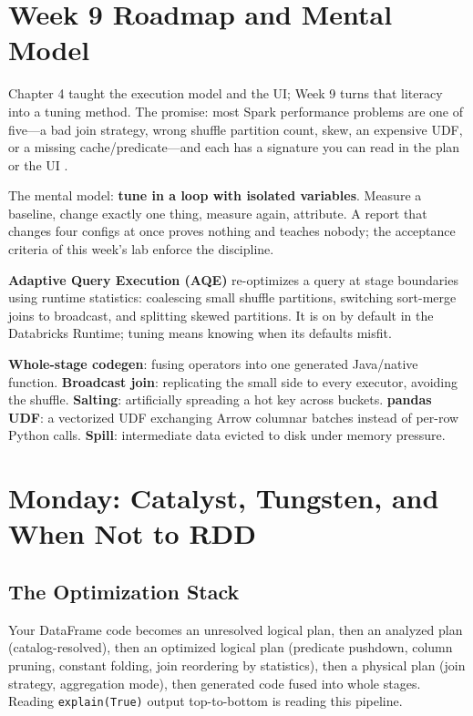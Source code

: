 \section{Week 9 Roadmap and Mental Model}
Chapter 4 taught the execution model and the UI; Week 9 turns that literacy into a tuning method. The promise: most Spark performance problems are one of five---a bad join strategy, wrong shuffle partition count, skew, an expensive UDF, or a missing cache/predicate---and each has a signature you can read in the plan or the UI \cite{sparkSQLTuning,chambersZaharia}.

The mental model: \textbf{tune in a loop with isolated variables}. Measure a baseline, change exactly one thing, measure again, attribute. A report that changes four configs at once proves nothing and teaches nobody; the acceptance criteria of this week's lab enforce the discipline.

\begin{definitionbox}
\textbf{Adaptive Query Execution (AQE)} re-optimizes a query at stage boundaries using runtime statistics: coalescing small shuffle partitions, switching sort-merge joins to broadcast, and splitting skewed partitions. It is on by default in the Databricks Runtime; tuning means knowing when its defaults misfit.
\end{definitionbox}

\begin{keyterms}
\textbf{Whole-stage codegen}: fusing operators into one generated Java/native function. \textbf{Broadcast join}: replicating the small side to every executor, avoiding the shuffle. \textbf{Salting}: artificially spreading a hot key across buckets. \textbf{pandas UDF}: a vectorized UDF exchanging Arrow columnar batches instead of per-row Python calls. \textbf{Spill}: intermediate data evicted to disk under memory pressure.
\end{keyterms}

\section{Monday: Catalyst, Tungsten, and When Not to RDD}
\subsection{The Optimization Stack}
Your DataFrame code becomes an unresolved logical plan, then an analyzed plan (catalog-resolved), then an optimized logical plan (predicate pushdown, column pruning, constant folding, join reordering by statistics), then a physical plan (join strategy, aggregation mode), then generated code fused into whole stages. Reading \texttt{explain(True)} output top-to-bottom is reading this pipeline.

